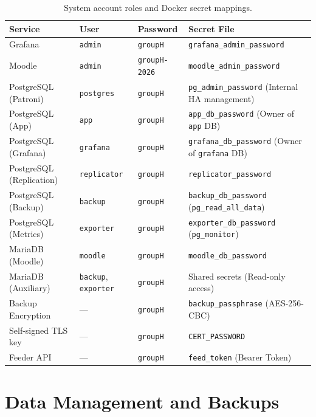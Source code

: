 \documentclass[11pt,a4paper]{article}
\begin{document}
\begin{table}[H]
\centering\small
\begin{tabularx}{\textwidth}{lllY}
\toprule
\textbf{Service} & \textbf{User} & \textbf{Password} & \textbf{Secret File} \\
\midrule
Grafana & \texttt{admin} & \texttt{groupH} & \texttt{grafana\_admin\_password} \\
Moodle & \texttt{admin} & \texttt{groupH-2026} & \texttt{moodle\_admin\_password} \\
PostgreSQL (Patroni) & \texttt{postgres} & \texttt{groupH} & \texttt{pg\_admin\_password} (Internal HA management) \\
PostgreSQL (App) & \texttt{app} & \texttt{groupH} & \texttt{app\_db\_password} (Owner of \texttt{app} DB) \\
PostgreSQL (Grafana) & \texttt{grafana} & \texttt{groupH} & \texttt{grafana\_db\_password} (Owner of \texttt{grafana} DB) \\
PostgreSQL (Replication) & \texttt{replicator} & \texttt{groupH} & \texttt{replicator\_password} \\
PostgreSQL (Backup) & \texttt{backup} & \texttt{groupH} & \texttt{backup\_db\_password} (\texttt{pg\_read\_all\_data}) \\
PostgreSQL (Metrics) & \texttt{exporter} & \texttt{groupH} & \texttt{exporter\_db\_password} (\texttt{pg\_monitor}) \\
MariaDB (Moodle) & \texttt{moodle} & \texttt{groupH} & \texttt{moodle\_db\_password} \\
MariaDB (Auxiliary) & \texttt{backup}, \texttt{exporter} & \texttt{groupH} & Shared secrets (Read-only access) \\
Backup Encryption & --- & \texttt{groupH} & \texttt{backup\_passphrase} (AES-256-CBC) \\
Self-signed TLS key & --- & \texttt{groupH} & \texttt{CERT\_PASSWORD} \\
Feeder API & --- & \texttt{groupH} & \texttt{feed\_token} (Bearer Token) \\
\bottomrule
\end{tabularx}
\caption{System account roles and Docker secret mappings.}
\label{tab:credentials}
\end{table}


\section{Data Management and Backups}
\label{sec:backup}
\end{document}
